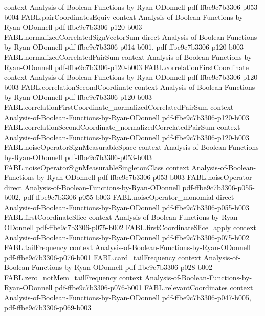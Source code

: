 \begin{theorem}
  {context}
  {Analysis-of-Boolean-Functions-by-Ryan-ODonnell}
  {pdf-ffbe9c7b3306-p053-b004}
\proofstep
  {FABL.pairCoordinatesEquiv}
  {context}
  {Analysis-of-Boolean-Functions-by-Ryan-ODonnell}
  {pdf-ffbe9c7b3306-p120-b003}
\proofstep
  {FABL.normalizedCorrelatedSignVectorSum}
  {direct}
  {Analysis-of-Boolean-Functions-by-Ryan-ODonnell}
  {pdf-ffbe9c7b3306-p014-b001,
    pdf-ffbe9c7b3306-p120-b003}
\proofstep
  {FABL.normalizedCorrelatedPairSum}
  {context}
  {Analysis-of-Boolean-Functions-by-Ryan-ODonnell}
  {pdf-ffbe9c7b3306-p120-b003}
\proofstep
  {FABL.correlationFirstCoordinate}
  {context}
  {Analysis-of-Boolean-Functions-by-Ryan-ODonnell}
  {pdf-ffbe9c7b3306-p120-b003}
\proofstep
  {FABL.correlationSecondCoordinate}
  {context}
  {Analysis-of-Boolean-Functions-by-Ryan-ODonnell}
  {pdf-ffbe9c7b3306-p120-b003}
\proofstep
  {FABL.correlationFirstCoordinate_normalizedCorrelatedPairSum}
  {context}
  {Analysis-of-Boolean-Functions-by-Ryan-ODonnell}
  {pdf-ffbe9c7b3306-p120-b003}
\proofstep
  {FABL.correlationSecondCoordinate_normalizedCorrelatedPairSum}
  {context}
  {Analysis-of-Boolean-Functions-by-Ryan-ODonnell}
  {pdf-ffbe9c7b3306-p120-b003}
\proofstep
  {FABL.noiseOperatorSignMeasurableSpace}
  {context}
  {Analysis-of-Boolean-Functions-by-Ryan-ODonnell}
  {pdf-ffbe9c7b3306-p053-b003}
\proofstep
  {FABL.noiseOperatorSignMeasurableSingletonClass}
  {context}
  {Analysis-of-Boolean-Functions-by-Ryan-ODonnell}
  {pdf-ffbe9c7b3306-p053-b003}
\proofstep
  {FABL.noiseOperator}
  {direct}
  {Analysis-of-Boolean-Functions-by-Ryan-ODonnell}
  {pdf-ffbe9c7b3306-p055-b002,
    pdf-ffbe9c7b3306-p055-b003}
\proofstep
  {FABL.noiseOperator_monomial}
  {direct}
  {Analysis-of-Boolean-Functions-by-Ryan-ODonnell}
  {pdf-ffbe9c7b3306-p055-b003}
\proofstep
  {FABL.firstCoordinateSlice}
  {context}
  {Analysis-of-Boolean-Functions-by-Ryan-ODonnell}
  {pdf-ffbe9c7b3306-p075-b002}
\proofstep
  {FABL.firstCoordinateSlice_apply}
  {context}
  {Analysis-of-Boolean-Functions-by-Ryan-ODonnell}
  {pdf-ffbe9c7b3306-p075-b002}
\proofstep
  {FABL.tailFrequency}
  {context}
  {Analysis-of-Boolean-Functions-by-Ryan-ODonnell}
  {pdf-ffbe9c7b3306-p076-b001}
\proofstep
  {FABL.card_tailFrequency}
  {context}
  {Analysis-of-Boolean-Functions-by-Ryan-ODonnell}
  {pdf-ffbe9c7b3306-p028-b002}
\proofstep
  {FABL.zero_notMem_tailFrequency}
  {context}
  {Analysis-of-Boolean-Functions-by-Ryan-ODonnell}
  {pdf-ffbe9c7b3306-p076-b001}
\proofstep
  {FABL.relevantCoordinates}
  {context}
  {Analysis-of-Boolean-Functions-by-Ryan-ODonnell}
  {pdf-ffbe9c7b3306-p047-b005,
    pdf-ffbe9c7b3306-p069-b003}

\end{theorem}

